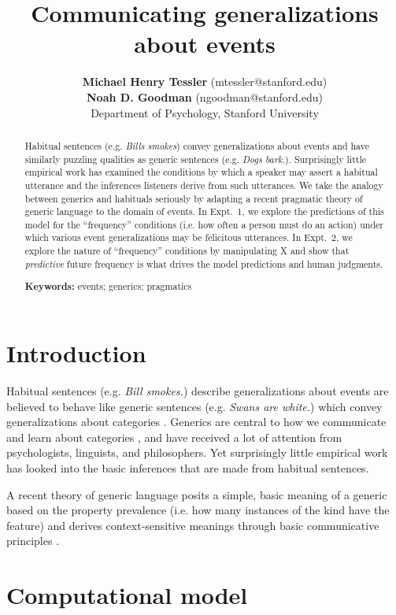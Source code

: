 \documentclass[10pt,letterpaper]{article}
\title{Communicating generalizations about events}
\author{{\large \bf Michael Henry Tessler} (mtessler@stanford.edu) \\ {\large \bf Noah D. Goodman} (ngoodman@stanford.edu) \\
  Department of Psychology, Stanford University}
\begin{document}
\maketitle


\begin{abstract}
Habitual sentences (e.g. \emph{Bills smokes}) convey generalizations about events and have similarly puzzling qualities as generic sentences (e.g. \emph{Dogs bark.}). 
Surprisingly little empirical work has examined the conditions by which a speaker may assert a habitual utterance and the inferences listeners derive from such utterances.
We take the analogy between generics and habituals seriously by adapting a recent pragmatic theory of generic language to the domain of events.
In Expt.~1, we explore the predictions of this model for the ``frequency'' conditions (i.e. how often a person must do an action) under which various event generalizations may be felicitous utterances. 
In Expt.~2, we explore the nature of ``frequency'' conditions by manipulating X and show that \emph{predictive} future frequency is what drives the model predictions and human judgments. 

\textbf{Keywords:} 
events; generics; pragmatics
\end{abstract}


\section{Introduction}

Habitual sentences (e.g. \emph{Bill smokes.}) describe generalizations about events are believed to behave like generic sentences (e.g. \emph{Swans are white.}) which convey generalizations about categories \cite{Carlson2005}.
Generics are central to how we communicate and learn about categories \cite{Carlson1977, Gelman2004}, and have received a lot of attention from psychologists, linguists, and philosophers.
Yet surprisingly little empirical work has looked into the basic inferences that are made from habitual sentences.

A recent theory of generic language posits a simple, basic meaning of a generic based on the property prevalence (i.e. how many instances of the kind have the feature) and derives context-sensitive meanings through basic communicative principles \cite{TesslerUnderReview}.

\section{Computational model}
\end{document}
